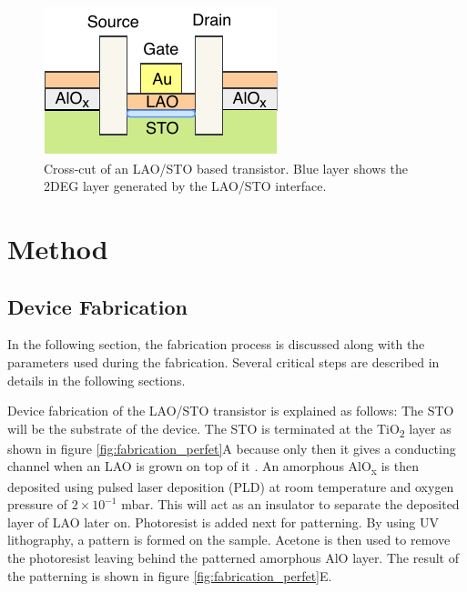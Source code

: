 \documentclass[11pt,a4paper]{report}
\begin{document}

\begin{figure}
    \centering
    \includegraphics[scale=1.25]{Figures/CrosscutPerfet.pdf}
    \caption{Cross-cut of an LAO/STO based transistor. Blue layer shows the 2DEG layer generated by the LAO/STO interface.}
    \label{fig:perFET crosscut}
\end{figure}


\chapter{Method}

\section{Device Fabrication}
In the following section, the fabrication process is discussed along with the parameters used during the fabrication. Several critical steps are described in details in the following sections.

Device fabrication of the LAO/STO transistor is explained as follows: The STO will be the substrate of the device. The STO is terminated at the TiO\textsubscript{2} layer as shown in figure \ref{fig:fabrication_perfet}A because only then it gives a conducting channel when an LAO is grown on top of it \cite{ohtomo_hwang_2004}.  An amorphous AlO\textsubscript{x} is then deposited using pulsed laser deposition (PLD) at room temperature and oxygen pressure of $2\times10^{-1}$ mbar. This will act as an insulator to separate the deposited layer of LAO later on. Photoresist is added next for patterning. By using UV lithography, a pattern is formed on the sample. Acetone is then used to remove the photoresist leaving behind the patterned amorphous AlO layer. The result of the patterning is shown in figure \ref{fig:fabrication_perfet}E. 
\end{document}
